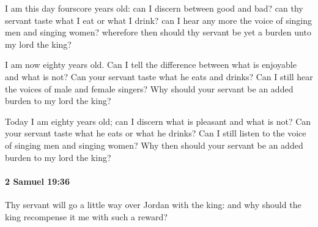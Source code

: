 			\begin{versebox}
					\item[BHS] 
					\item[ASV] I am this day fourscore years old: can I discern between good and bad? can thy servant taste what I eat or what I drink? can I hear any more the voice of singing men and singing women? wherefore then should thy servant be yet a burden unto my lord the king?
					\item[NIV] I am now eighty years old. Can I tell the difference between what is enjoyable and what is not? Can your servant taste what he eats and drinks? Can I still hear the voices of male and female singers? Why should your servant be an added burden to my lord the king?
					\item[NRSV] Today I am eighty years old; can I discern what is pleasant and what is not? Can your servant taste what he eats or what he drinks? Can I still listen to the voice of singing men and singing women? Why then should your servant be an added burden to my lord the king?
			\end{versebox}

		\paragraph{2 Samuel 19:36} %
			\label{2SAMUEL-19-36}

			Thy servant will go a little way over Jordan with the king: and why should the king recompense it me with such a reward?

